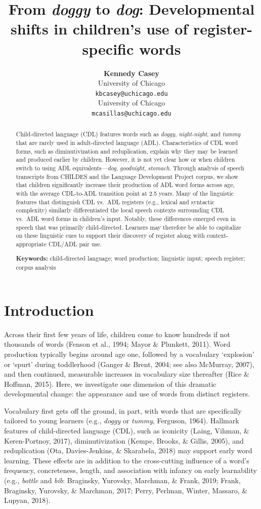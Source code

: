 \documentclass[10pt, letterpaper]{article}
\title{From \emph{doggy} to \emph{dog}: Developmental shifts in
children's use of register-specific words}
\author{{\large \bf Kennedy Casey} \\ University of Chicago \\ \texttt{kbcasey@uchicago.edu} \And {\large \bf Marisa Casillas} \\ University of Chicago \\ \texttt{mcasillas@uchicago.edu}}
\begin{document}
\maketitle

\begin{abstract}
Child-directed language (CDL) features words such as \emph{doggy},
\emph{night-night}, and \emph{tummy} that are rarely used in
adult-directed language (ADL). Characteristics of CDL word forms, such
as diminutivization and reduplication, explain why they may be learned
and produced earlier by children. However, it is not yet clear how or
when children switch to using ADL equivalents---\emph{dog},
\emph{goodnight}, \emph{stomach}. Through analysis of speech transcripts
from CHILDES and the Language Development Project corpus, we show that
children significantly increase their production of ADL word forms
across age, with the average CDL-to-ADL transition point at 2.5 years.
Many of the linguistic features that distinguish CDL vs.~ADL registers
(e.g., lexical and syntactic complexity) similarly differentiated the
local speech contexts surrounding CDL vs.~ADL word forms in children's
input. Notably, these differences emerged even in speech that was
primarily child-directed. Learners may therefore be able to capitalize
on these linguistic cues to support their discovery of register along
with context-appropriate CDL/ADL pair use.

\textbf{Keywords:}
child-directed language; word production; linguistic input; speech
register; corpus analysis
\end{abstract}

\hypertarget{introduction}{%
\section{Introduction}\label{introduction}}

Across their first few years of life, children come to know hundreds if
not thousands of words (Fenson et al., 1994; Mayor \& Plunkett, 2011).
Word production typically begins around age one, followed by a
vocabulary `explosion' or `spurt' during toddlerhood (Ganger \& Brent,
2004; see also McMurray, 2007), and then continued, measurable increases
in vocabulary size thereafter (Rice \& Hoffman, 2015). Here, we
investigate one dimension of this dramatic developmental change: the
appearance and use of words from distinct registers.

Vocabulary first gets off the ground, in part, with words that are
specifically tailored to young learners (e.g., \emph{doggy} or
\emph{tummy}, Ferguson, 1964). Hallmark features of child-directed
language (CDL), such as iconicity (Laing, Vihman, \& Keren-Portnoy,
2017), diminutivization (Kempe, Brooks, \& Gillis, 2005), and
reduplication (Ota, Davies-Jenkins, \& Skarabela, 2018) may support
early word learning. These effects are in addition to the cross-cutting
influence of a word's frequency, concreteness, length, and association
with infancy on early learnability (e.g., \emph{bottle} and \emph{bib}:
Braginsky, Yurovsky, Marchman, \& Frank, 2019; Frank, Braginsky,
Yurovsky, \& Marchman, 2017; Perry, Perlman, Winter, Massaro, \& Lupyan,
2018).
\end{document}
